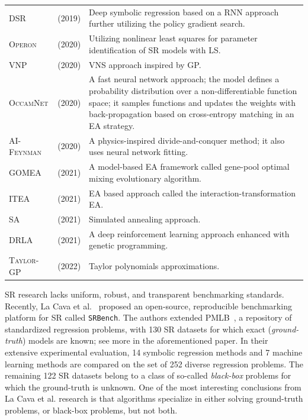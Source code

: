 \documentclass{bmcart}
\begin{document}
\begin{table}[!h]
{\begin{tabularx}{550pt}{l  l  X}
			\textsc{DSR}  & \cite{petersen2019deep} (2019) & Deep symbolic regression based on a RNN approach further utilizing the policy gradient search. \\
			\textsc{Operon} & \cite{kommenda2020parameter} (2020) &  Utilizing nonlinear least squares for parameter identification of SR models with LS. \\
			\textsc{VNP}    & \cite{elleuch2020variable} (2020) & VNS approach inspired by GP. \\
			\textsc{OccamNet} & \cite{costa2020fast} (2020) &   A fast neural network approach; the model defines a probability distribution over a non-differentiable function space; it samples functions and updates the weights with back-propagation based on cross-entropy matching in an EA strategy.	 \\
			
			\textsc{AI-Feynman} & \cite{udrescu2020ai} (2020) & A physics-inspired divide-and-conquer method; it also uses neural network fitting. \\
			\textsc{GOMEA}  & \cite{virgolin2021improving} (2021)    & A model-based
			EA framework called gene-pool optimal mixing evolutionary algorithm. \\
			\textsc{ITEA} & \cite{de2021interaction} (2021)   & EA based approach called the interaction-transformation EA.   \\
			\textsc{SA} & \cite{kantor2021simulated} (2021) &  Simulated annealing approach. \\
			
			\textsc{DRLA} & \cite{mundhenk2021symbolic} (2021)  &    A deep reinforcement learning approach enhanced with genetic programming. \\
			\textsc{Taylor-GP} &  \cite{he2022taylor} (2022)  &  Taylor polynomials approximations.  \\ \hline
			
			
	\end{tabularx} }
\end{table}

	
SR research lacks uniform, robust, and transparent
benchmarking standards. Recently, La Cava et al.~\cite{la2021contemporary} proposed an
open-source, reproducible benchmarking platform for SR called \texttt{SRBench}. The authors extended  PMLB~\cite{olson2017pmlb},  a repository of standardized regression problems, with 130 SR datasets for which exact (\emph{ground-truth}) models are known; see more in the aforementioned paper. In their extensive experimental evaluation, 14
symbolic regression methods and 7 machine learning methods are compared on the set of 252 diverse regression problems. The remaining 122 SR datasets belong to a class of so-called \emph{black-box} problems for which the ground-truth is unknown. One of the most interesting conclusions from La Cava et al. research is that algorithms specialize in either solving ground-truth problems, or black-box problems, but not both. 
\end{document}
